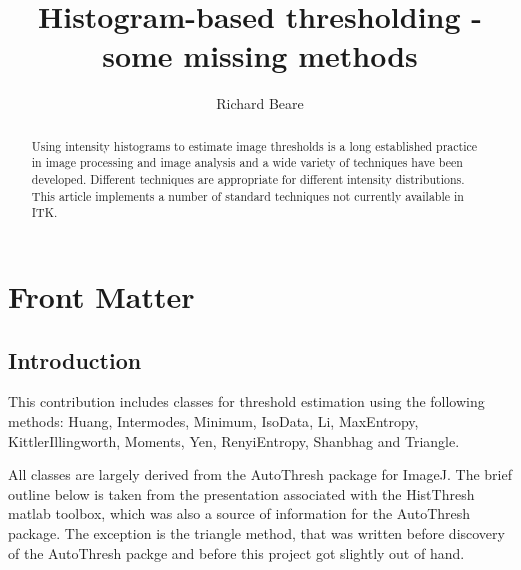 \documentclass{InsightArticle}
\title{Histogram-based thresholding - some missing methods}
\author{Richard Beare}
\newcommand{\IJhandlerIDnumber}{}
\begin{document}
%
% 
\IJhandlefooter{\IJhandlerIDnumber}

\maketitle

\ifhtml
\chapter*{Front Matter\label{front}}
\fi


\begin{abstract}
\noindent
Using intensity histograms to estimate image thresholds is a long
established practice in image processing and image analysis and a wide
variety of techniques have been developed. Different techniques are
appropriate for different intensity distributions. This article
implements a number of standard techniques not currently available in
ITK.
\end{abstract}

\IJhandlenote{\IJhandlerIDnumber}

\tableofcontents

\section{Introduction}
This contribution includes classes for threshold estimation using the
following methods: Huang\cite{huang1995image},
Intermodes\cite{prewitt1965analysis},
Minimum\cite{prewitt1965analysis}, IsoData\cite{ridler1978picture},
Li\cite{li1993minimum,li1998iterative}, MaxEntropy\cite{kapur1985new},
KittlerIllingworth\cite{kittler1986minimum},
Moments\cite{tsai1985moment}, Yen\cite{yen1995new},
RenyiEntropy\cite{kapur1985new},
Shanbhag\cite{shanbhag1994utilization} and
Triangle\cite{zack1977automatic}.

All classes are largely derived from the AutoThresh
\cite{LandiniImageJ} package for ImageJ. The brief outline below is
taken from the presentation associated with the
HistThresh\cite{HistThreshMatlab} matlab toolbox, which was also a
source of information for the AutoThresh package. The exception is the
triangle method, that was written before discovery of the AutoThresh
packge and before this project got slightly out of hand.
\end{document}
